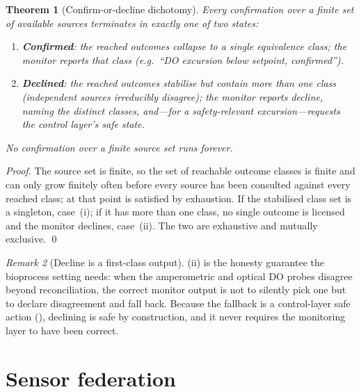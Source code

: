 \documentclass[11pt,a4paper,twocolumn]{article}
\theoremstyle{thmstyle}
\newtheorem{theorem}{Theorem}[section]
\theoremstyle{definition}
\theoremstyle{remark}
\newtheorem{remark}[theorem]{Remark}
\begin{document}
\begin{theorem}[Confirm-or-decline dichotomy]
\label{thm:decline}
Every confirmation over a finite set of available sources terminates in
exactly one of two states:
\begin{enumerate}[label=\textup{(\roman*)},leftmargin=2.2em,itemsep=1pt]
\item \textbf{Confirmed}: the reached outcomes collapse to a single
equivalence class; the monitor reports that class (e.g.\ ``DO excursion
below setpoint, confirmed'').
\item \textbf{Declined}: the reached outcomes stabilise but contain more
than one class (independent sources irreducibly disagree); the monitor
reports \emph{decline}, naming the distinct classes, and---for a
safety-relevant excursion---requests the control layer's safe state.
\end{enumerate}
No confirmation over a finite source set runs forever.
\end{theorem}

\begin{proof}
The source set is finite, so the set of reachable outcome classes is
finite and can only grow finitely often before every source has been
consulted against every reached class; at that point 
is satisfied by exhaustion. If the stabilised class set is a singleton,
case~(i); if it has more than one class, no single outcome is licensed
and the monitor declines, case~(ii). The two are exhaustive and mutually
exclusive. \qed
\end{proof}

\begin{remark}[Decline is a first-class output]
\label{rem:decline}
(ii) is the honesty guarantee the bioprocess setting
needs: when the amperometric and optical DO probes disagree beyond
reconciliation, the correct monitor output is not to silently pick one
but to declare disagreement and fall back. Because the fallback is a
control-layer safe action (), declining is safe by
construction, and it never requires the monitoring layer to have been
correct.
\end{remark}

\section{Sensor federation}
\label{sec:federation}
\end{document}
